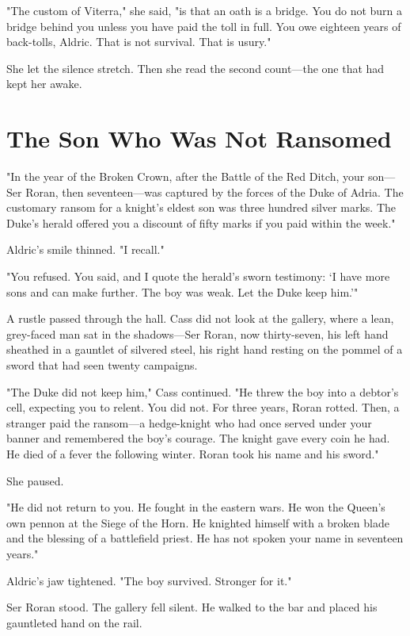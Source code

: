 \documentclass[11pt,twoside]{book}
\begin{document}
"The custom of Viterra," she said, "is that an oath is a bridge. You do not burn a bridge behind you unless you have paid the toll in full. You owe eighteen years of back-tolls, Aldric. That is not survival. That is usury."

She let the silence stretch. Then she read the second count---the one that had kept her awake.

\section{The Son Who Was Not Ransomed}

"In the year of the Broken Crown, after the Battle of the Red Ditch, your son---Ser Roran, then seventeen---was captured by the forces of the Duke of Adria. The customary ransom for a knight's eldest son was three hundred silver marks. The Duke's herald offered you a discount of fifty marks if you paid within the week."

Aldric's smile thinned. "I recall."

"You refused. You said, and I quote the herald's sworn testimony: `I have more sons and can make further. The boy was weak. Let the Duke keep him.'"

A rustle passed through the hall. Cass did not look at the gallery, where a lean, grey-faced man sat in the shadows---Ser Roran, now thirty-seven, his left hand sheathed in a gauntlet of silvered steel, his right hand resting on the pommel of a sword that had seen twenty campaigns.

"The Duke did not keep him," Cass continued. "He threw the boy into a debtor's cell, expecting you to relent. You did not. For three years, Roran rotted. Then, a stranger paid the ransom---a hedge-knight who had once served under your banner and remembered the boy's courage. The knight gave every coin he had. He died of a fever the following winter. Roran took his name and his sword."

She paused.

"He did not return to you. He fought in the eastern wars. He won the Queen's own pennon at the Siege of the Horn. He knighted himself with a broken blade and the blessing of a battlefield priest. He has not spoken your name in seventeen years."

Aldric's jaw tightened. "The boy survived. Stronger for it."

Ser Roran stood. The gallery fell silent. He walked to the bar and placed his gauntleted hand on the rail.
\end{document}
